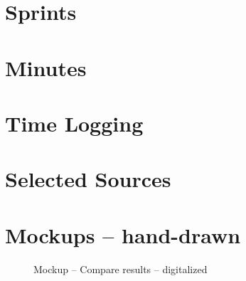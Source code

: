 \begin{appendix}

\chapter{Sprints}

\chapter{Minutes}

\chapter{Time Logging}

\chapter{Selected Sources}

\chapter{Mockups – hand-drawn}

\begin{figure}[!h]
  \centering
  \caption{Mockup – Compare results – digitalized }
  \label{fig:mCompareResultsMockup}
\end{figure}


\end{appendix}
